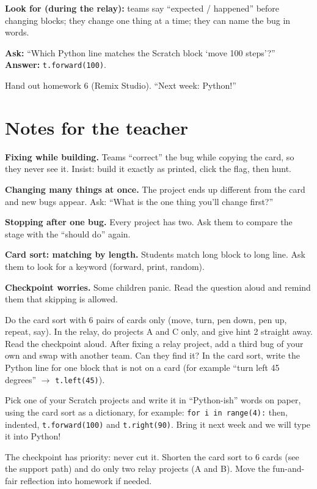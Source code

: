 \begin{formativecheck}
\textbf{Look for (during the relay):} teams say \enquote{expected / happened} before changing blocks; they change one thing at a time; they can name the bug in words.

\textbf{Ask:} \enquote{Which Python line matches the Scratch block \enquote{move 100 steps}?}
\textbf{Answer:} \texttt{t.forward(100)}.
\end{formativecheck}

Hand out homework 6 (Remix Studio). \enquote{Next week: Python!}

\section{Notes for the teacher}
\begin{commonmistakes}
  \item \textbf{Fixing while building.} Teams \enquote{correct} the bug while copying the card, so they never see it. Insist: build it exactly as printed, click the flag, then hunt.
  \item \textbf{Changing many things at once.} The project ends up different from the card and new bugs appear. Ask: \enquote{What is the one thing you'll change first?}
  \item \textbf{Stopping after one bug.} Every project has two. Ask them to compare the stage with the \enquote{should do} again.
  \item \textbf{Card sort: matching by length.} Students match long block to long line. Ask them to look for a keyword (forward, print, random).
  \item \textbf{Checkpoint worries.} Some children panic. Read the question aloud and remind them that skipping is allowed.
\end{commonmistakes}

\begin{differentiation}
\supportpath Do the card sort with 6 pairs of cards only (move, turn, pen down, pen up, repeat, say). In the relay, do projects A and C only, and give hint 2 straight away. Read the checkpoint aloud.
\extensionpath After fixing a relay project, add a third bug of your own and swap with another team. Can they find it? In the card sort, write the Python line for one block that is not on a card (for example \enquote{turn left 45 degrees} $\rightarrow$ \texttt{t.left(45)}).
\end{differentiation}

\begin{stretchchallenge}
Pick one of your Scratch projects and write it in \enquote{Python-ish} words on paper, using the card sort as a dictionary, for example: \texttt{for i in range(4):} then, indented, \texttt{t.forward(100)} and \texttt{t.right(90)}. Bring it next week and we will type it into Python!
\end{stretchchallenge}

\begin{teachernote}
The checkpoint has priority: never cut it. Shorten the card sort to 6 cards (see the support path) and do only two relay projects (A and B). Move the fun-and-fair reflection into homework if needed.
\end{teachernote}
